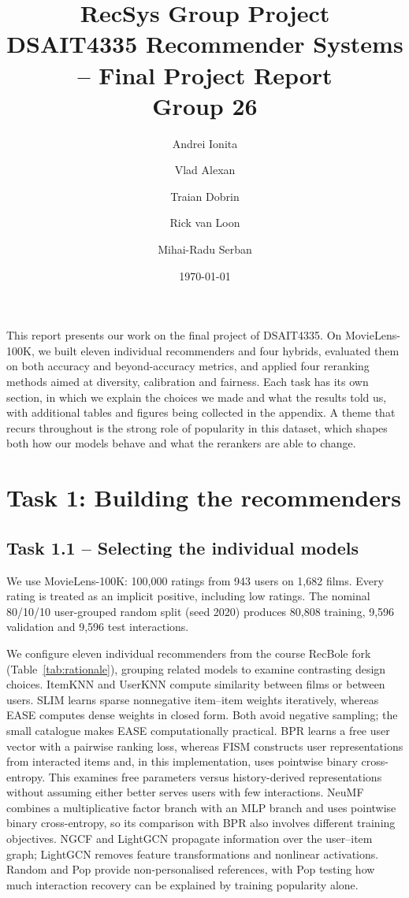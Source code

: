 \documentclass[12pt,a4paper]{article}   %
\title{RecSys Group Project\\[4pt]
  \large DSAIT4335 Recommender Systems -- Final Project Report\\[2pt]
  \large Group 26}
\author{
  Andrei Ionita \and Vlad Alexan \and Traian Dobrin \and Rick van Loon \and Mihai-Radu Serban\\[6pt]
}
\date{\today}
\begin{document}
\maketitle
\thispagestyle{empty}
\pagestyle{empty}

\vspace{1cm}
This report presents our work on the final project of DSAIT4335. On MovieLens-100K, we built eleven individual recommenders and four hybrids, evaluated them on both accuracy and beyond-accuracy metrics, and applied four reranking methods aimed at diversity, calibration and fairness. Each task has its own section, in which we explain the choices we made and what the results told us, with additional tables and figures being collected in the appendix. A theme that recurs throughout is the strong role of popularity in this dataset, which shapes both how our models behave and what the rerankers are able to change.

\newpage

\section{Task 1: Building the recommenders}

\subsection{Task 1.1 -- Selecting the individual models}

We use MovieLens-100K: 100,000 ratings from 943 users on
1,682 films. Every rating is treated as an implicit positive,
including low ratings. The nominal 80/10/10 user-grouped
random split (seed 2020) produces 80,808 training, 9,596
validation and 9,596 test interactions.

We configure eleven individual recommenders from the course
RecBole fork (Table~\ref{tab:rationale}), grouping related
models to examine contrasting design choices.
ItemKNN and UserKNN compute similarity between films or
between users. SLIM learns sparse nonnegative item--item
weights iteratively, whereas EASE computes dense weights
in closed form. Both avoid negative sampling; the small
catalogue makes EASE computationally practical.
BPR learns a free user vector with a pairwise ranking loss,
whereas FISM constructs user representations from interacted
items and, in this implementation, uses pointwise binary
cross-entropy. This examines free parameters versus
history-derived representations without assuming either
better serves users with few interactions. NeuMF combines
a multiplicative factor branch with an MLP branch and uses
pointwise binary cross-entropy, so its comparison with BPR
also involves different training objectives. NGCF and
LightGCN propagate information over the user--item graph;
LightGCN removes feature transformations and nonlinear
activations. Random and Pop provide non-personalised
references, with Pop testing how much interaction recovery
can be explained by training popularity alone.
\end{document}
